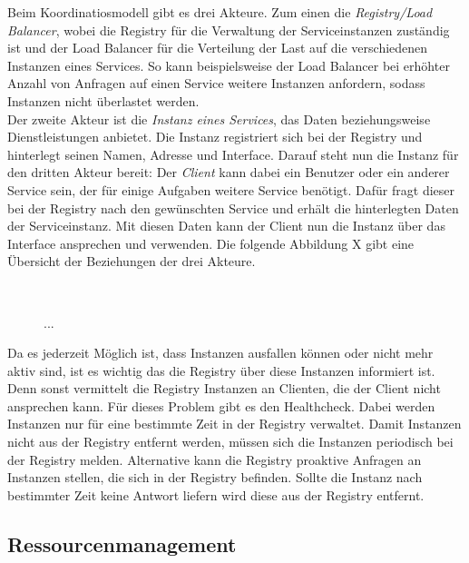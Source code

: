 Beim Koordinatiosmodell gibt es drei Akteure. Zum einen die \textit{Registry/Load Balancer}, wobei die Registry für die Verwaltung der Serviceinstanzen zuständig ist und der Load Balancer für die Verteilung der Last auf die verschiedenen Instanzen eines Services. So kann beispielsweise der Load Balancer bei erhöhter Anzahl von Anfragen auf einen Service weitere Instanzen anfordern, sodass Instanzen nicht überlastet werden.\\
Der zweite Akteur ist die \textit{Instanz eines Services}, das Daten beziehungsweise Dienstleistungen anbietet. Die Instanz registriert sich bei der Registry und hinterlegt seinen Namen, Adresse und Interface. Darauf steht nun die Instanz für den dritten Akteur bereit: Der \textit{Client} kann dabei ein Benutzer oder ein anderer Service sein, der für einige Aufgaben weitere Service benötigt. Dafür fragt dieser bei der Registry nach den gewünschten Service und erhält die hinterlegten Daten der Serviceinstanz. Mit diesen Daten kann der Client nun die Instanz über das Interface ansprechen und verwenden. Die folgende Abbildung X gibt eine Übersicht der Beziehungen der drei Akteure.

\\
\begin{figure}[h]
...
\end{figure}

Da es jederzeit Möglich ist, dass Instanzen ausfallen können oder nicht mehr aktiv sind, ist es wichtig das die Registry über diese Instanzen informiert ist. Denn sonst vermittelt die Registry Instanzen an Clienten, die der Client nicht ansprechen kann. Für dieses Problem gibt es den Healthcheck. Dabei werden Instanzen nur für eine bestimmte Zeit in der Registry verwaltet. Damit Instanzen nicht aus der Registry entfernt werden, müssen sich die Instanzen periodisch bei der Registry melden. Alternative kann die Registry proaktive Anfragen an Instanzen stellen, die sich in der Registry befinden. Sollte die Instanz nach bestimmter Zeit keine Antwort liefern wird diese aus der Registry entfernt.

\subsection{Ressourcenmanagement}

